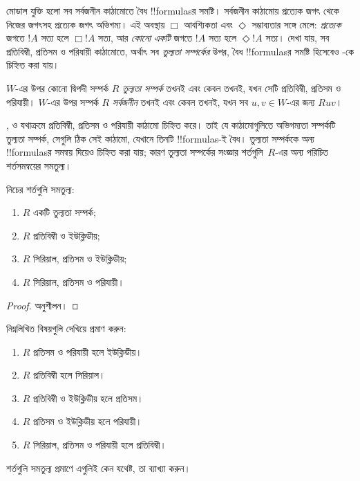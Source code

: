 \documentclass[../../../include/open-logic-section]{subfiles}
\begin{document}


মোডাল যুক্তি  হলো সব সর্বজনীন কাঠামোতে বৈধ !!{formula}sর সমষ্টি। সর্বজনীন কাঠামোয় প্রত্যেক জগৎ থেকে নিজের জগৎসহ প্রত্যেক জগৎ অভিগম্য। এই অবস্থায় $\Box$ আবশ্যিকতা এবং $\Diamond$ সম্ভাব্যতার সঙ্গে মেলে: \emph{প্রত্যেক} জগতে $!A$ সত্য হলে $\Box !A$ সত্য, আর \emph{কোনো একটি} জগতে $!A$ সত্য হলে $\Diamond !A$ সত্য। দেখা যায়, সব প্রতিবিম্বী, প্রতিসম ও পরিযায়ী কাঠামোতে, অর্থাৎ সব \emph{তুল্যতা সম্পর্কের} উপর, বৈধ !!{formula}sর সমষ্টি হিসেবেও -কে চিহ্নিত করা যায়।

\begin{defn}
  $W$-এর উপর কোনো দ্বিপদী সম্পর্ক $R$ \emph{তুল্যতা সম্পর্ক} তখনই এবং কেবল তখনই, যখন সেটি প্রতিবিম্বী, প্রতিসম ও পরিযায়ী। $W$-এর উপর সম্পর্ক $R$ \emph{সর্বজনীন} তখনই এবং কেবল তখনই, যখন সব $u,v \in
  W$-এর জন্য $Ruv$।
\end{defn}

,  ও  যথাক্রমে প্রতিবিম্বী, প্রতিসম ও পরিযায়ী কাঠামো চিহ্নিত করে। তাই যে কাঠামোগুলিতে অভিগম্যতা সম্পর্কটি তুল্যতা সম্পর্ক, সেগুলি ঠিক সেই কাঠামো, যেখানে তিনটি !!{formula}s-ই বৈধ। তুল্যতা সম্পর্ককে অন্য !!{formula}sর সমন্বয় দিয়েও চিহ্নিত করা যায়; কারণ তুল্যতা সম্পর্কের সংজ্ঞার শর্তগুলি~$R$-এর অন্য পরিচিত শর্তসমন্বয়ের সমতুল্য।

\begin{prop}
  নিচের শর্তগুলি সমতুল্য:
  \begin{enumerate}
  \item $R$ একটি তুল্যতা সম্পর্ক;
  \item $R$ প্রতিবিম্বী ও ইউক্লিডীয়;
  \item $R$ সিরিয়াল, প্রতিসম ও ইউক্লিডীয়;
  \item $R$ সিরিয়াল, প্রতিসম ও পরিযায়ী।
  \end{enumerate}
\end{prop}

\begin{proof}
  অনুশীলন।
\end{proof}

\begin{prob}
  নিম্নলিখিত বিষয়গুলি দেখিয়ে  প্রমাণ করুন:
  \begin{enumerate}
  \item $R$ প্রতিসম ও পরিযায়ী হলে ইউক্লিডীয়।
  \item $R$ প্রতিবিম্বী হলে সিরিয়াল।
  \item $R$ প্রতিবিম্বী ও ইউক্লিডীয় হলে প্রতিসম।
  \item $R$ প্রতিসম ও ইউক্লিডীয় হলে পরিযায়ী।
  \item $R$ সিরিয়াল, প্রতিসম ও পরিযায়ী হলে প্রতিবিম্বী।
  \end{enumerate}
  শর্তগুলি সমতুল্য প্রমাণে এগুলিই কেন যথেষ্ট, তা ব্যাখ্যা করুন।
\end{prob}
\end{document}
